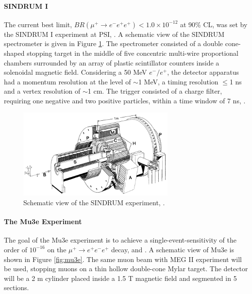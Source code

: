 \paragraph{SINDRUM I}
The current best limit, $BR(\mu^+ \rightarrow e^- e^+ e^+) < 1.0 \times 10^{- 12}$ at 90\% CL, was set by the
SINDRUM I experiment at PSI, \cite{sindrumi}. A schematic view of the SINDRUM spectrometer is given in Figure \ref{fig:sindrumi}. 
The spectrometer consisted of a double cone-shaped stopping target in the middle of five concentric multi-wire proportional chambers surrounded by an array of plastic
scintillator counters inside a solenoidal magnetic field. Considering a 50 MeV $e^-/e^+$, the detector 
apparatus had a momentum resolution at the level of $\sim$1 MeV,
a timing resolution $\leq$1 ns and a vertex resolution of $\sim$1 cm. 
The trigger consisted of a charge filter, requiring one negative and two 
positive particles, within a time window of 7 ns, \cite{universe8060299}.
\begin{figure}[!h]
\centering
\includegraphics[width =0.7\textwidth]{figures/png/The-SINDRUM-I-detector-in-the-horizontal-operating-orientation.png}
\caption[SINDRUM experiment.]{Schematic view of the SINDRUM experiment, \cite{sindrumi}.}
\label{fig:sindrumi}
\end{figure}

\paragraph{The Mu3e Experiment}
The goal of the Mu3e experiment is to achieve a single-event-sensitivity of the order
of $10^{-16}$ on the $\mu^+ \rightarrow e^+ e^-  e^+ $ decay, \cite{hesketh2022mu3e} and \cite{papa}. 
A schematic view of Mu3e is shown in Figure \ref{fig:mu3e}.
The same muon beam with MEG II experiment will be used, stopping muons on a thin hollow double-cone Mylar target. 
The detector will be a 2 m cylinder placed inside a 1.5 T magnetic field and segmented in 5 sections.

